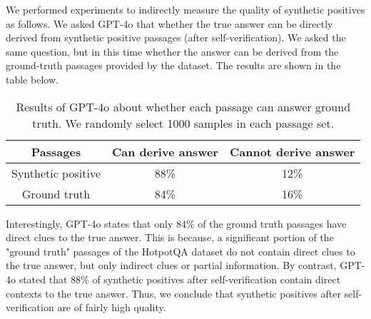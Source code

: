We performed experiments to indirectly measure the quality of synthetic positives as follows. We asked GPT-4o that whether the true answer can be directly derived from synthetic positive passages (after self-verification). We asked the same question, but in this time whether the answer can be derived from the ground-truth passages provided by the dataset. The results are shown in the table below.

\begin{table}[t!]
    \centering
    \begin{adjustbox}{width=.5\textwidth,center}
    \begin{tabular}{c|c|c}
        Passages & Can derive answer& Cannot derive answer\\\hline
        Synthetic positive & 88\% & 12\% \\
        Ground truth & 84\% & 16\%
    \end{tabular}
    \end{adjustbox}
    \caption{Results of GPT-4o about whether each passage can answer ground truth. We randomly select 1000 samples in each passage set.}
    \label{tab:self_verifiacition}
\end{table}

Interestingly, GPT-4o states that only 84\% of the ground truth passages have direct clues to the true answer. This is because, a significant portion of the "ground truth" passages of the  HotpotQA dataset do not contain direct clues to the true answer, but only indirect clues or partial information. By contrast, GPT-4o stated that 88\% of synthetic positives after self-verification contain direct contexts to the true answer. Thus, we conclude that synthetic positives after self-verification are of fairly high quality.